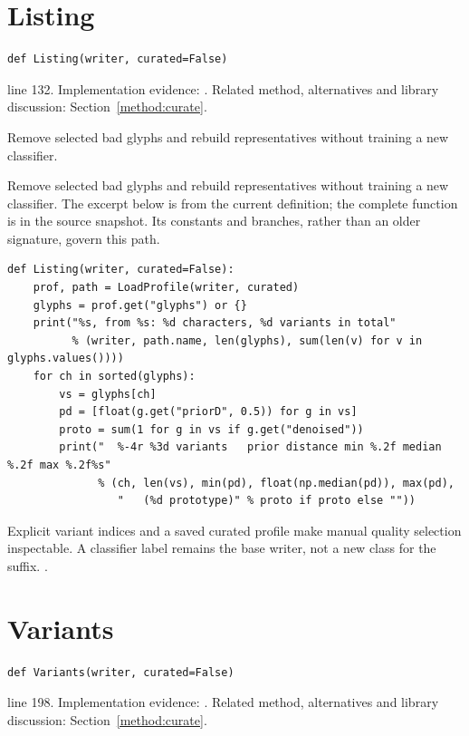 \section{Listing}\label{fn:curate:Listing}
\begin{lstlisting}[style=sig]
def Listing(writer, curated=False)
\end{lstlisting}
 line 132. Implementation evidence: \cite{code2026}. Related method, alternatives and library discussion: Section~\ref{method:curate}.


Remove selected bad glyphs and rebuild representatives without training a new classifier.


Remove selected bad glyphs and rebuild representatives without training a new classifier. The excerpt below is from the current definition; the complete function is in the source snapshot. Its constants and branches, rather than an older signature, govern this path.


\begin{lstlisting}[style=plain]
def Listing(writer, curated=False):
    prof, path = LoadProfile(writer, curated)
    glyphs = prof.get("glyphs") or {}
    print("%s, from %s: %d characters, %d variants in total"
          % (writer, path.name, len(glyphs), sum(len(v) for v in glyphs.values())))
    for ch in sorted(glyphs):
        vs = glyphs[ch]
        pd = [float(g.get("priorD", 0.5)) for g in vs]
        proto = sum(1 for g in vs if g.get("denoised"))
        print("  %-4r %3d variants   prior distance min %.2f median %.2f max %.2f%s"
              % (ch, len(vs), min(pd), float(np.median(pd)), max(pd),
                 "   (%d prototype)" % proto if proto else ""))
\end{lstlisting}
Explicit variant indices and a saved curated profile make manual quality selection inspectable. A classifier label remains the base writer, not a new class for the suffix. \cite{code2026,haines2016,pillowdraw}.


\section{Variants}\label{fn:curate:Variants}
\begin{lstlisting}[style=sig]
def Variants(writer, curated=False)
\end{lstlisting}
 line 198. Implementation evidence: \cite{code2026}. Related method, alternatives and library discussion: Section~\ref{method:curate}.


